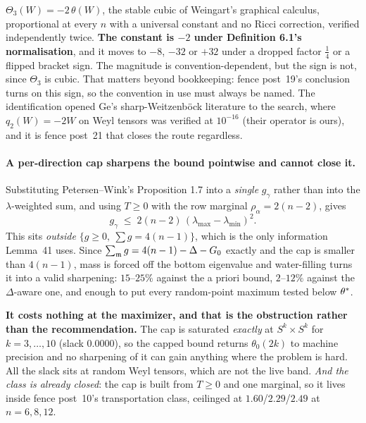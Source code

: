 \begin{remarkstar}
$\Theta_3(W)=-2\,\theta(W)$, the stable cubic of Weingart's graphical calculus, proportional at every $n$ with a universal constant and no Ricci correction, verified independently twice. \textbf{The constant is $-2$ under Definition 6.1's normalisation}, and it moves to $-8$, $-32$ or $+32$ under a dropped factor $\tfrac14$ or a flipped bracket sign. The magnitude is convention-dependent, but the sign is not, since $\Theta_3$ is cubic. That matters beyond bookkeeping: fence post~19's conclusion turns on this sign, so the convention in use must always be named. The identification opened Ge's sharp-Weitzenb\"ock literature to the search, where $q_2(W)=-2W$ on Weyl tensors was verified at $10^{-16}$ (their operator is ours), and it is fence post~21 that closes the route regardless.
\end{remarkstar}

\paragraph{A per-direction cap sharpens the bound pointwise and cannot close it.} Substituting Petersen--Wink's Proposition 1.7 into a \emph{single} $g_\gamma$ rather than into the $\lambda$-weighted sum, and using $T\ge0$ with the row marginal $\rho_\alpha=2(n-2)$, gives
\[
g_\gamma\;\le\;2(n-2)\,(\lambda_{\max}-\lambda_{\min})^2 .
\]
This sits \emph{outside} $\{g\ge0,\ \sum g=4(n-1)\}$, which is the only information Lemma~41 uses. Since $\sum_{\mathfrak{m}}g=4(n-1)-\Delta-G_0$ exactly and the cap is smaller than $4(n-1)$, mass is forced off the bottom eigenvalue and water-filling turns it into a valid sharpening: $15$--$25\%$ against the a priori bound, $2$--$12\%$ against the $\Delta$-aware one, and enough to put every random-point maximum tested below $\theta^{*}$.

\textbf{It costs nothing at the maximizer, and that is the obstruction rather than the recommendation.} The cap is saturated \emph{exactly} at $S^k\times S^k$ for $k=3,\dots,10$ (slack $0.0000$), so the capped bound returns $\theta_0(2k)$ to machine precision and no sharpening of it can gain anything where the problem is hard. All the slack sits at random Weyl tensors, which are not the live band. \emph{And the class is already closed}: the cap is built from $T\ge0$ and one marginal, so it lives inside fence post~10's transportation class, ceilinged at $1.60$/$2.29$/$2.49$ at $n=6,8,12$.

